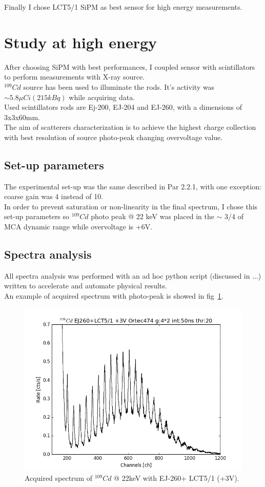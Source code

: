 \documentclass[10pt,a4paper, openany]{book}
\begin{document}
Finally I chose LCT5/1 SiPM as best sensor for high energy measurements.

\section{Study at high energy}
After choosing SiPM with best performances, I coupled sensor with scintillators to perform measurements with X-ray source.\\
$^{109}Cd$ source has been used to illuminate the rods. It's activity was $\sim 5.8 \mu Ci (215 kBq)$ while acquiring data.\\
Used scintillators rods are Ej-200, EJ-204 and EJ-260, with a dimensions of 3x3x60mm.\\
The aim of scatterers characterization is to achieve the highest charge collection with best resolution of source photo-peak changing overvoltage value.

\subsection{Set-up parameters}
The experimental set-up was the same described in Par 2.2.1, with one exception: coarse gain was 4 instead of 10.\\
In order to prevent saturation or non-linearity in the final spectrum, I chose this set-up parameters so $^{109}Cd$ photo peak @ 22 keV was placed in the $\sim$ 3/4 of MCA dynamic range while overvoltage is +6V.
\subsection{Spectra analysis}
All spectra analysis was performed with an ad hoc python script (discussed in ...) written to accelerate and automate physical results.\\
An example of acquired spectrum with photo-peak is showed in fig~\ref{fig:es_spec}.

\begin{figure}[!h]
\begin{center}
\includegraphics[scale=0.5]{imm/es_spec.png}
\end{center}
\caption{Acquired spectrum of $^{109}Cd$ @ 22keV with EJ-260+ LCT5/1 (+3V).} 
\label{fig:es_spec}
\end{figure}
\end{document}
